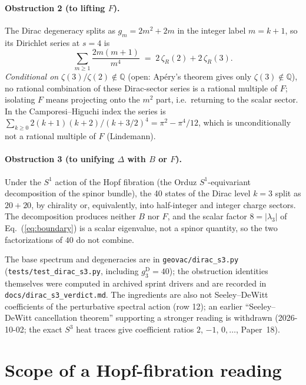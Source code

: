 \documentclass[aps,prl,twocolumn,superscriptaddress]{revtex4-2}
\begin{document}
\paragraph{Obstruction 2 (to lifting $F$).}
The Dirac degeneracy splits as $g_m = 2m^2 + 2m$ in the integer label
$m = k+1$, so its Dirichlet series at $s = 4$ is
\begin{equation}\label{eq:D_dirac_zeta3}
  \sum_{m\geq 1}\frac{2m(m+1)}{m^4}
  \;=\; 2\,\zeta_R(2) + 2\,\zeta_R(3).
\end{equation}
\emph{Conditional on} $\zeta(3)/\zeta(2) \notin \mathbb{Q}$ (open:
Ap\'ery's theorem gives only $\zeta(3) \notin \mathbb{Q}$), no rational
combination of these Dirac-sector series is a rational multiple of $F$;
isolating $F$ means projecting onto the $m^2$ part, i.e.\ returning to
the scalar sector. In the Camporesi--Higuchi index the series is
$\sum_{k\ge0} 2(k+1)(k+2)/(k+3/2)^4 = \pi^2 - \pi^4/12$, which is
unconditionally not a rational multiple of $F$ (Lindemann).

\paragraph{Obstruction 3 (to unifying $\Delta$ with $B$ or $F$).}
Under the $S^1$ action of the Hopf fibration (the Orduz
$S^1$-equivariant decomposition of the spinor bundle), the 40 states of
the Dirac level $k = 3$ split as $20 + 20$, by chirality or,
equivalently, into half-integer and integer charge sectors. The
decomposition produces neither $B$ nor $F$, and the
scalar factor $8 = |\lambda_3|$ of Eq.~(\ref{eq:boundary}) is a scalar
eigenvalue, not a spinor quantity, so the two factorizations of $40$
do not combine.

The base spectrum and degeneracies are in \texttt{geovac/dirac\_s3.py}
(\texttt{tests/test\_dirac\_s3.py}, including $g_3^{\mathrm{D}} = 40$);
the obstruction identities themselves were computed in archived sprint
drivers and are recorded in \texttt{docs/dirac\_s3\_verdict.md}.
The ingredients are also not Seeley--DeWitt coefficients of the
perturbative spectral action (row 12); an earlier ``Seeley--DeWitt
cancellation theorem'' supporting a stronger reading is withdrawn
(2026-10-02; the exact $S^3$ heat traces give coefficient ratios $2$,
$-1$, $0, \ldots$, Paper~18).


\section{Scope of a Hopf-fibration reading}\label{sec:scope}
\end{document}
